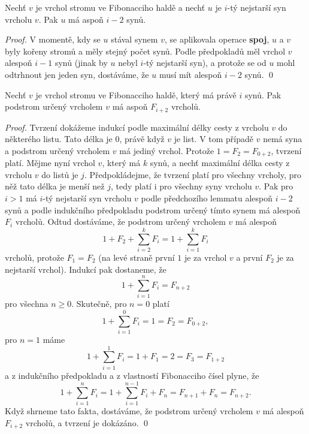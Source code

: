 \documentclass[a4paper,12pt]{article}
\begin{document}
\begin{lemma}Nechť $v$ je vrchol stromu ve 
Fibonacciho haldě a nechť $u$ je $i$-tý nejstarší syn 
vrcholu $v$. Pak $u$ má aspoň $i-2$ synů.
\end{lemma}

\begin{proof}V momentě, kdy se $u$ stával synem $v$, se 
aplikovala operace {\bf spoj}, $u$ a $v$ byly kořeny 
stromů a měly stejný počet synů. 
Podle předpokladů měl vrchol $v$ alespoň $i-1$ 
synů (jinak by $u$ nebyl $i$-tý nejstarší syn), a 
protože se od $u$ mohl odtrhnout jen jeden syn, 
dostáváme, že $u$ musí mít alespoň $i-2$ synů. \qed
\end{proof}

\begin{tvrzeni}Nechť $v$ je vrchol stromu ve 
Fibonacciho haldě, kte\-rý má právě $i$ synů. Pak 
podstrom určený vrcholem $v$ má aspoň $F_{i+2}$ 
vrcholů.
\end{tvrzeni}

\begin{proof}Tvrzení dokážeme indukcí 
podle maximální délky cesty z vrcholu $v$ do některého 
listu.  Tato délka je $0$, právě když $v$ je list.  V tom 
případě $v$ nemá syna a podstrom určený vrcholem $
v$ má 
jediný vrchol.  Protože $1=F_2=F_{0+2}$, tvrzení platí.  
Mějme nyní vrchol $v$, který má $k$ 
synů, a nechť maximální délka cesty z vrcholu $
v$ do 
listů je $j$. Předpokládej\-me, že tvrzení platí pro 
všechny vrcholy, pro něž tato délka  
je menší než $j$,  tedy platí i pro 
všechny syny vrcholu $v$.  Pak pro $i>1$ má $i$-tý nejstarší 
syn vrcholu $v$ podle předchozího lemmatu alespoň $i-2$ 
synů a podle indukčního předpokladu podstrom určený 
tímto synem má alespoň $F_i$ vrcholů.  Odtud 
dostáváme, že podstrom určený vrcholem $v$ má alespoň 
$$1+F_2+\sum_{i=2}^kF_i=1+\sum_{i=1}^kF_i$$
vrcholů, protože $F_1=F_2$ (na levé straně první $
1$ 
je za vrchol $v$ a 
první $F_2$ je za nejstarší vrchol). Indukcí pak dostaneme, že 
$$1+\sum_{i=1}^nF_i=F_{n+2}$$
pro všechna $n\ge 0$. Skutečně, pro $n=0$ platí 
$$1+\sum_{i=1}^0F_i=1=F_2=F_{0+2},$$
pro $n=1$ máme 
$$1+\sum_{i=1}^1F_i=1+F_1=2=F_3=F_{1+2}$$
a z indukčního předpokladu a z vlastností Fibonacciho 
čísel plyne, že 
$$1+\sum_{i=1}^nF_i=1+\sum_{i=1}^{n-1}F_i+F_n=F_{n+1}+F_n=F_{n+2}
.$$
Když shrneme tato fakta, dostáváme, že podstrom 
určený vrcholem $v$ má alespoň $F_{i+2}$ vrcholů, a 
tvrzení je dokázáno. \qed
\end{proof}
\end{document}
